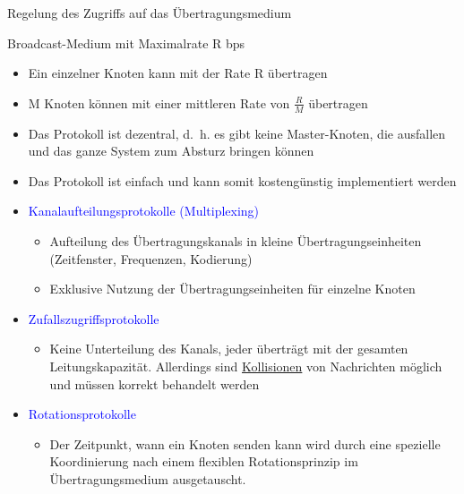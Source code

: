 
Regelung des Zugriffs auf das Übertragungsmedium

Broadcast-Medium mit Maximalrate R bps
\begin{itemize}
    \item Ein einzelner Knoten kann mit der Rate R übertragen
    \item M Knoten können mit einer mittleren Rate von $\frac{R}{M}$ übertragen
    \item Das Protokoll ist dezentral, d.\ h. es gibt keine Master-Knoten, die ausfallen und das ganze System zum Absturz bringen können
    \item Das Protokoll ist einfach und kann somit kostengünstig implementiert werden
\end{itemize}

\begin{itemize}
    \item \textcolor{blue}{Kanalaufteilungsprotokolle (Multiplexing)}
    \begin{itemize}
        \item Aufteilung des Übertragungskanals in kleine Übertragungseinheiten (Zeitfenster, Frequenzen, Kodierung)
        \item Exklusive Nutzung der Übertragungseinheiten für einzelne Knoten
    \end{itemize}
    \item \textcolor{blue}{Zufallszugriffsprotokolle}
    \begin{itemize}
        \item Keine Unterteilung des Kanals, jeder überträgt mit der gesamten Leitungskapazität.
        Allerdings sind \underline{Kollisionen} von Nachrichten möglich und müssen korrekt behandelt werden
    \end{itemize}
    \item \textcolor{blue}{Rotationsprotokolle}
    \begin{itemize}
        \item Der Zeitpunkt, wann ein Knoten senden kann wird durch eine spezielle Koordinierung nach einem flexiblen Rotationsprinzip im Übertragungsmedium ausgetauscht.
    \end{itemize}
\end{itemize}

